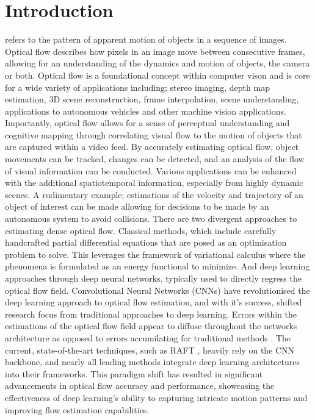 \section{Introduction}\label{sec:intro}

 refers to the pattern of apparent motion of objects in a sequence of images. Optical flow describes how pixels in an image move between consecutive frames, allowing for an understanding of the dynamics and motion of objects, the camera or both. Optical flow is a foundational concept within computer vison and is core for a wide variety of applications including; stereo imaging, depth map estimation, 3D scene reconstruction, frame interpolation, scene understanding, applications to autonomous vehicles and other machine vision applications.
\IEEEPARstart{}{} Importantly, optical flow allows for a sense of perceptual understanding and cognitive mapping through correlating visual flow to the motion of objects that are captured within a video feed. By accurately estimating optical flow, object movements can be tracked, changes can be detected, and an analysis of the flow of visual information can be conducted. Various applications can be enhanced with the additional spatiotemporal information, especially from highly dynamic scenes. A rudimentary example; estimations of the velocity and trajectory of an object of interest can be made allowing for decisions to be made by an autonomous system to avoid collisions.
\IEEEPARstart{}{} There are two divergent approaches to estimating dense optical flow. Classical methods, which include carefully handcrafted partial differential equations that are posed as an optimisation problem to solve. This leverages the framework of variational calculus where the phenomena is formulated as an energy functional to minimize. And deep learning approaches through deep neural networks, typically used to directly regress the optical flow field. 
\IEEEPARstart{}{} Convolutional Neural Networks (CNNs) have revolutionised the deep learning approach to optical flow estimation, and with it's success, shifted research focus from traditional approaches to deep learning. Errors within the estimations of the optical flow field appear to diffuse throughout the networks architecture as opposed to errors accumilating for traditional methods \cite{dosovitskiy2015flownet,sun2018pwc}. The current, state-of-the-art techniques, such as RAFT \cite{teed2020raft}, heavily rely on the CNN backbone, and nearly all leading methods integrate deep learning architectures into their frameworks. This paradigm shift has resulted in significant advancements in optical flow accuracy and performance, showcasing the effectiveness of deep learning's ability to capturing intricate motion patterns and improving flow estimation capabilities. 
